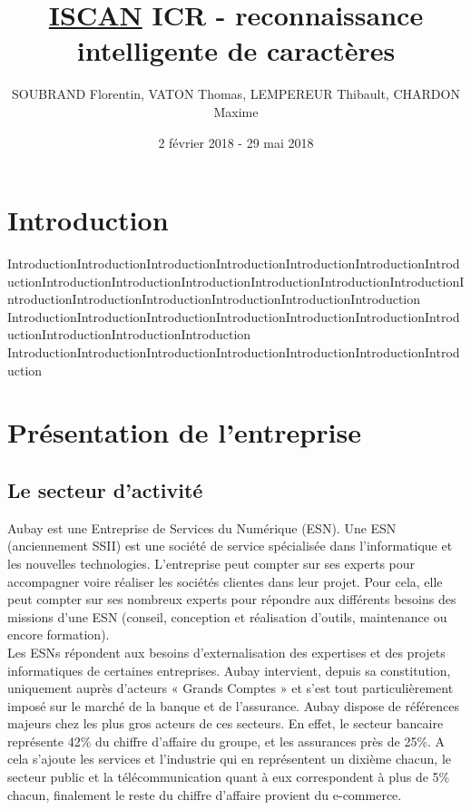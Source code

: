\documentclass[12pt,a4paper]{article}
\title{\textbf { \huge{\underline{ISCAN}} \bigbreak  \large{ICR - reconnaissance intelligente de caractères}}}
\author{SOUBRAND Florentin, VATON Thomas, LEMPEREUR Thibault, CHARDON Maxime}
\date {2 février 2018 - 29 mai 2018}
\begin{document}
\pagestyle{fancy}

\maketitle

\newpage
\thispagestyle{empty}
\tableofcontents

\newpage
{}
\section{Introduction}
IntroductionIntroductionIntroductionIntroductionIntroductionIntroductionIntroductionIntroductionIntroductionIntroductionIntroductionIntroductionIntroductionIntroductionIntroductionIntroductionIntroductionIntroductionIntroduction
IntroductionIntroductionIntroductionIntroductionIntroductionIntroductionIntroductionIntroductionIntroductionIntroduction
IntroductionIntroductionIntroductionIntroductionIntroductionIntroductionIntroduction


\newpage

\section{Présentation de l'entreprise}
\subsection{Le secteur d'activité}
Aubay est une Entreprise de Services du Numérique (ESN). Une ESN (anciennement SSII) est une société de service spécialisée dans l'informatique et les nouvelles technologies. L'entreprise peut compter sur ses experts pour accompagner voire réaliser les sociétés clientes dans leur projet. Pour cela, elle peut compter sur ses nombreux experts pour répondre aux différents besoins des missions d'une ESN (conseil, conception et réalisation d’outils, maintenance ou encore formation).\\
Les ESNs répondent aux besoins d'externalisation des expertises et des projets informatiques de certaines entreprises.
\bigbreak
Aubay intervient, depuis sa constitution, uniquement auprès d’acteurs « Grands Comptes » et s’est tout particulièrement imposé sur le marché de la banque et de l’assurance. Aubay dispose de références majeurs chez les plus gros acteurs de ces secteurs. En effet, le secteur bancaire représente 42\% du chiffre d’affaire du groupe, et les assurances près de 25\%. A cela s’ajoute les services et l’industrie qui en représentent un dixième chacun, le secteur public et la télécommunication quant à eux correspondent à plus de 5\% chacun, finalement le reste du chiffre d’affaire provient du e-commerce.
\end{document}
